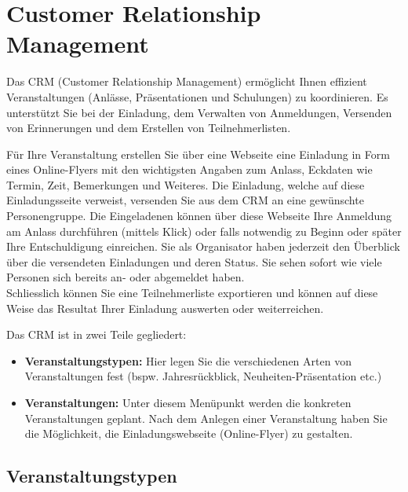
\clearpage
\section{Customer Relationship Management}

Das CRM (Customer Relationship Management) ermöglicht Ihnen effizient Veranstaltungen (Anlässe, Präsentationen und Schulungen) zu koordinieren. Es unterstützt Sie bei der Einladung, dem Verwalten von Anmeldungen, Versenden von Erinnerungen und dem Erstellen von Teilnehmerlisten.

\vspace{\baselineskip}

Für Ihre Veranstaltung erstellen Sie über eine Webseite eine Einladung in Form eines Online-Flyers mit den wichtigsten Angaben zum Anlass, Eckdaten wie Termin, Zeit, Bemerkungen und Weiteres. Die Einladung, welche auf diese Einladungsseite verweist, versenden Sie aus dem CRM an eine gewünschte Personengruppe. Die Eingeladenen können über diese Webseite Ihre Anmeldung am Anlass durchführen (mittels Klick) oder falls notwendig zu Beginn oder später Ihre Entschuldigung einreichen. Sie als Organisator haben jederzeit den Überblick über die versendeten Einladungen und deren Status. Sie sehen sofort wie viele Personen sich bereits an- oder abgemeldet haben. \\

Schliesslich können Sie eine Teilnehmerliste exportieren und können auf diese Weise das Resultat Ihrer Einladung auswerten oder weiterreichen.

\vspace{\baselineskip}

Das CRM ist in zwei Teile gegliedert: 
\begin{itemize}
\item
\textbf{Veranstaltungstypen:} Hier legen Sie die verschiedenen Arten von Veranstaltungen fest (bspw. Jahresrückblick, Neuheiten-Präsentation etc.)
\item
\textbf{Veranstaltungen:} Unter diesem Menüpunkt werden die konkreten Veranstaltungen geplant. Nach dem Anlegen einer Veranstaltung haben Sie die Möglichkeit, die Einladungswebseite (Online-Flyer) zu gestalten.
\end{itemize}

\pagebreak
\subsection{Veranstaltungstypen}

